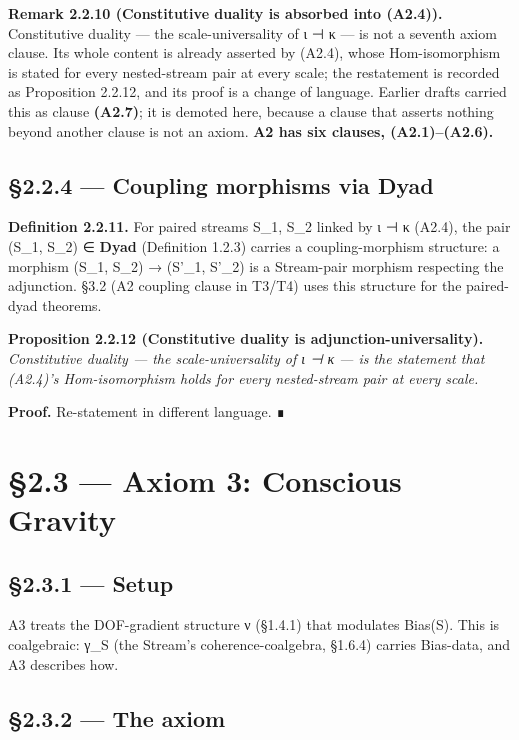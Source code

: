 \documentclass[11pt, openany]{book}
\newcommand{\sectionbreak}{\clearpage}
\begin{document}
\textbf{Remark 2.2.10 (Constitutive duality is absorbed into (A2.4)).} Constitutive duality --- the scale-universality of ι ⊣ κ --- is not a seventh axiom clause. Its whole content is already asserted by (A2.4), whose Hom-isomorphism is stated for every nested-stream pair at every scale; the restatement is recorded as Proposition 2.2.12, and its proof is a change of language. Earlier drafts carried this as clause \textbf{(A2.7)}; it is demoted here, because a clause that asserts nothing beyond another clause is not an axiom. \textbf{A2 has six clauses, (A2.1)–(A2.6).}

\subsection{§2.2.4 --- Coupling morphisms via \textbf{Dyad}}

\textbf{Definition 2.2.11.} For paired streams S\_\allowbreak{}1, S\_\allowbreak{}2 linked by ι ⊣ κ (A2.4), the pair (S\_\allowbreak{}1, S\_\allowbreak{}2) ∈ \textbf{Dyad} (Definition 1.2.3) carries a coupling-morphism structure: a morphism (S\_\allowbreak{}1, S\_\allowbreak{}2) → (S'\_\allowbreak{}1, S'\_\allowbreak{}2) is a Stream-pair morphism respecting the adjunction. §3.2 (A2 coupling clause in T3/T4) uses this structure for the paired-dyad theorems.

\textbf{Proposition 2.2.12 (Constitutive duality is adjunction-universality).} \textit{Constitutive duality --- the scale-universality of ι ⊣ κ --- is the statement that (A2.4)'s Hom-isomorphism holds for every nested-stream pair at every scale.}

\textbf{Proof.} Re-statement in different language. ∎

\sectionbreak

\section{§2.3 --- Axiom 3: Conscious Gravity}

\subsection{§2.3.1 --- Setup}

A3 treats the DOF-gradient structure ν (§1.4.1) that modulates Bias(S). This is coalgebraic: γ\_\allowbreak{}S (the Stream's coherence-coalgebra, §1.6.4) carries Bias-data, and A3 describes how.

\subsection{§2.3.2 --- The axiom}
\end{document}
